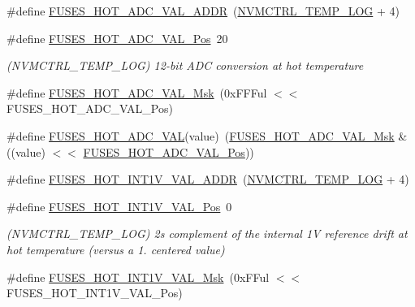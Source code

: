 \begin{DoxyCompactItemize}
\item 
\#define \mbox{\hyperlink{group__fuses__api_gafd0f088c88270c6f6b68f1e7e49af33d}{F\+U\+S\+E\+S\+\_\+\+H\+O\+T\+\_\+\+A\+D\+C\+\_\+\+V\+A\+L\+\_\+\+A\+D\+DR}}~(\mbox{\hyperlink{group___s_a_m_d21_j18_a__base_gae900d443ec6d7cf1c90d21b6662fa447}{N\+V\+M\+C\+T\+R\+L\+\_\+\+T\+E\+M\+P\+\_\+\+L\+OG}} + 4)
\item 
\#define \mbox{\hyperlink{group__fuses__api_gafe7e5ce8a612702c58af6772f5e29985}{F\+U\+S\+E\+S\+\_\+\+H\+O\+T\+\_\+\+A\+D\+C\+\_\+\+V\+A\+L\+\_\+\+Pos}}~20
\begin{DoxyCompactList}\small\item\em (N\+V\+M\+C\+T\+R\+L\+\_\+\+T\+E\+M\+P\+\_\+\+L\+OG) 12-\/bit A\+DC conversion at hot temperature \end{DoxyCompactList}\item 
\#define \mbox{\hyperlink{group__fuses__api_ga838deb7bc86528e492764edddcf49ece}{F\+U\+S\+E\+S\+\_\+\+H\+O\+T\+\_\+\+A\+D\+C\+\_\+\+V\+A\+L\+\_\+\+Msk}}~(0x\+F\+F\+Ful $<$$<$ F\+U\+S\+E\+S\+\_\+\+H\+O\+T\+\_\+\+A\+D\+C\+\_\+\+V\+A\+L\+\_\+\+Pos)
\item 
\#define \mbox{\hyperlink{group__fuses__api_ga2742e55293067bb3c9da18f85c64070c}{F\+U\+S\+E\+S\+\_\+\+H\+O\+T\+\_\+\+A\+D\+C\+\_\+\+V\+AL}}(value)~(\mbox{\hyperlink{group__fuses__api_ga838deb7bc86528e492764edddcf49ece}{F\+U\+S\+E\+S\+\_\+\+H\+O\+T\+\_\+\+A\+D\+C\+\_\+\+V\+A\+L\+\_\+\+Msk}} \& ((value) $<$$<$ \mbox{\hyperlink{group__fuses__api_gafe7e5ce8a612702c58af6772f5e29985}{F\+U\+S\+E\+S\+\_\+\+H\+O\+T\+\_\+\+A\+D\+C\+\_\+\+V\+A\+L\+\_\+\+Pos}}))
\item 
\#define \mbox{\hyperlink{group__fuses__api_ga3c704507ec0c25c1e0ce3f92e4d7d9bc}{F\+U\+S\+E\+S\+\_\+\+H\+O\+T\+\_\+\+I\+N\+T1\+V\+\_\+\+V\+A\+L\+\_\+\+A\+D\+DR}}~(\mbox{\hyperlink{group___s_a_m_d21_j18_a__base_gae900d443ec6d7cf1c90d21b6662fa447}{N\+V\+M\+C\+T\+R\+L\+\_\+\+T\+E\+M\+P\+\_\+\+L\+OG}} + 4)
\item 
\#define \mbox{\hyperlink{group__fuses__api_ga8b14f5897dd4c958cde93e08ee14ae2a}{F\+U\+S\+E\+S\+\_\+\+H\+O\+T\+\_\+\+I\+N\+T1\+V\+\_\+\+V\+A\+L\+\_\+\+Pos}}~0
\begin{DoxyCompactList}\small\item\em (N\+V\+M\+C\+T\+R\+L\+\_\+\+T\+E\+M\+P\+\_\+\+L\+OG) 2\textquotesingle{}s complement of the internal 1V reference drift at hot temperature (versus a 1. centered value) \end{DoxyCompactList}\item 
\#define \mbox{\hyperlink{group__fuses__api_gada7c46dde8de1bb6463b4f652c54d610}{F\+U\+S\+E\+S\+\_\+\+H\+O\+T\+\_\+\+I\+N\+T1\+V\+\_\+\+V\+A\+L\+\_\+\+Msk}}~(0x\+F\+Ful $<$$<$ F\+U\+S\+E\+S\+\_\+\+H\+O\+T\+\_\+\+I\+N\+T1\+V\+\_\+\+V\+A\+L\+\_\+\+Pos)
$$
\end{DoxyCompactItemize}
